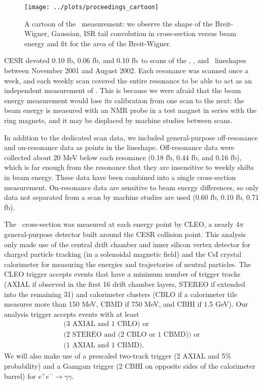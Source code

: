 \documentclass[aps,prd,preprint,superscriptaddress,tightenlines,nofootinbib,floatfix]{revtex4}
\begin{document}
\begin{figure}[t]
  \begin{center}
    \texttt{[image: ../plots/proceedings\_cartoon]}
  \end{center}
  \caption{\label{fig:cartoon} A cartoon of the \gee\ measurement: we
    observe the shape of the Breit-Wigner, Gaussian, ISR tail
    convolution in cross-section versus beam energy and fit for the
    area of the Breit-Wigner.}
\end{figure}

CESR devoted 0.10 fb\inv, 0.06 fb\inv, and 0.10 fb\inv\ to scans of
the \uone, \utwo, and \uthree\ lineshapes between November 2001 and
August 2002.  Each resonance was scanned once a week, and each
weekly scan covered the entire resonance to be able to act as an
independent measurement of \gee.  This is because we were afraid that
the beam energy measurement would lose its calibration from one scan
to the next: the beam energy is measured with an NMR probe in a test
magnet in series with the ring magnets, and it may be displaced by
machine studies between scans.

In addition to the dedicated scan data, we included general-purpose
off-resonance and on-resonance data as points in the lineshape.
Off-resonance data were collected about 20 MeV below each resonance
(0.18 fb\inv, 0.44 fb\inv, and 0.16 fb\inv), which is far enough from
the resonance that they are insensitive to weekly shifts in beam
energy.  These data have been combined into a single cross-section
measurement.  On-resonance data are sensitive to beam energy
differences, so only data not separated from a scan by machine studies
are used (0.60 fb\inv, 0.10 fb\inv, 0.71 fb\inv).

The \ups\ cross-section was measured at each energy point by CLEO, a
nearly $4\pi$ general-purpose detector built around the CESR collision
point.  This analysis only made use of the central drift chamber and
inner silicon vertex detector for charged particle tracking (in a
solenoidal magnetic field) and the CsI crystal calorimeter for
measuring the energies and trajectories of neutral particles.  The
CLEO trigger accepts events that have a minimum number of trigger
tracks (AXIAL if observed in the first 16 drift chamber layers, STEREO
if extended into the remaining 31) and calorimeter clusters (CBLO if a
calorimeter tile measures more than 150 MeV, CBMD if 750 MeV, and CBHI
if 1.5 GeV).  Our analysis trigger accepts events with at least
\begin{multline}
  \mbox{(3 AXIAL and 1 CBLO) or} \\
  \mbox{(2 STEREO and (2 CBLO or 1 CBMD)) or} \\
  \mbox{(1 AXIAL and 1 CBMD).} \label{eqn:trig}
\end{multline}
We will also make use of a prescaled two-track trigger (2 AXIAL and
5\% probability) and a Gamgam trigger (2 CBHI on opposite sides of the
calorimeter barrel) for $e^+e^- \to \gamma\gamma$.
\end{document}

